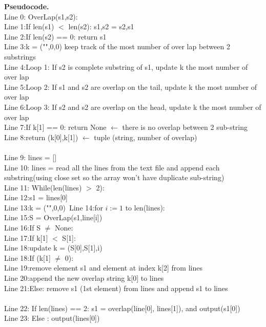 \documentclass[11pt]{article}
\newcommand{\tab}{\hspace*{2em}}
\begin{document}
\noindent
\textbf{Pseudocode.}\\
Line 0: OverLap(s1,s2):\\
Line 1:\tab If len(s1) $<$ len(s2): s1,s2 = s2,s1\\
Line 2:\tab If len(s2) == 0: return s1\\
Line 3:\tab k = ("",0,0) keep track of the most number of over lap between 2 substrings \\
Line 4:\tab Loop 1: If s2 is complete substring of s1, update k the most number of over lap \\
Line 5:\tab Loop 2: If s1 and s2 are overlap on the tail, update k the most number of over lap\\
Line 6:\tab Loop 3: If s2 and s2 are overlap on the head, update k the most number of over lap\\
Line 7:\tab If k[1] == 0: return None $\leftarrow$ there is no overlap between 2 sub-string\\
Line 8:\tab return (k[0],k[1]) $\leftarrow$ tuple (string, number of overlap)\\
\\
Line 9: lines = []\\
Line 10: lines = read all the lines from the text file and append each substring(using close set so the array won't have duplicate sub-string) \\
Line 11: While(len(lines) $>$ 2):\\
Line 12:\tab s1 = lines[0]\\
Line 13:\tab k = ("",0,0)\
Line 14:\tab for $i:= 1$ to len(lines):\\
Line 15:\tab S = OverLap(s1,line[i])\\
Line 16:\tab If S $\neq$ None:\\
Line 17:\tab\tab If k[1] $<$ S[1]:\\
Line 18:\tab\tab\tab update k = (S[0],S[1],i)\\
Line 18:\tab If (k[1] $\neq$ 0):\\
Line 19:\tab\tab remove element s1 and element at index k[2] from lines\\
Line 20:\tab\tab append the new overlap string k[0] to lines\\
Line 21:\tab Else: remove s1 (1st element) from lines and append s1 to lines\\
\\
Line 22: If len(lines) == 2: s1 = overlap(line[0], lines[1]), and output(s1[0])\\
Line 23: Else : output(lines[0])\\
\end{document}
